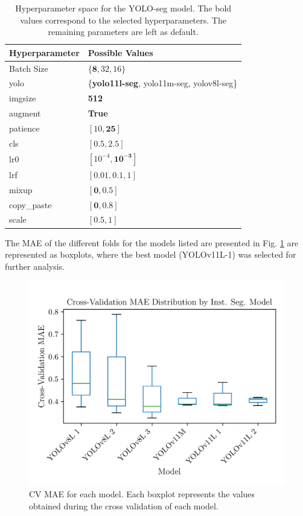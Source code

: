 \documentclass[conference]{IEEEtran}
\begin{document}


\begin{table}[H]
\centering
\caption{Hyperparameter space for the YOLO-seg model. The
bold values correspond to the selected hyperparameters. The remaining parameters are left as default.}
\label{parametrosseg}
\begin{tabular}{ll}
\toprule
\textbf{Hyperparameter} & \textbf{Possible Values} \\
\midrule
Batch Size & $\{\mathbf{8}, 32, 16\}$ \\
yolo & \{\textbf{yolo11l-seg}, yolo11m-seg, yolov8l-seg\} \\
imgsize & \textbf{512} \\
augment & \textbf{True} \\
patience & $[10, \mathbf{25}]$ \\
cls & $[\mathbf{0.5}, 2.5]$ \\
lr0 & $[10^{-4}, \mathbf{10^{-3}}]$ \\
lrf & $[0.01, \mathbf{0.1}, 1]$ \\
mixup & $[\mathbf{0}, 0.5]$ \\
copy\_paste & $[\mathbf{0}, 0.8]$ \\
scale & $[\mathbf{0.5}, 1]$ \\
\bottomrule
\end{tabular}
\end{table}

The MAE of the different folds for the models listed are presented in Fig. \ref{fig:model02_mae_boxplot} are represented as boxplots, where the best model (YOLOv11L-1) was selected for further analysis.

\begin{figure}[H]
    \centering
    \includegraphics[width=1\linewidth]{assets/model02_mae_boxplot.png}
    \caption{CV MAE for each model. Each boxplot represents the values obtained during the cross validation of each model.}
    \label{fig:model02_mae_boxplot}
\end{figure}
\end{document}
